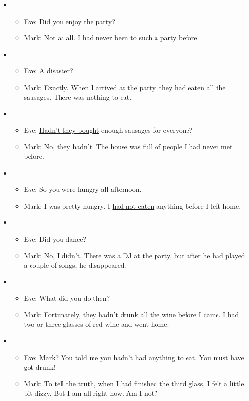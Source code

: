 \begin{itemize}

\item
\begin{itemize}
\item Eve: Did you enjoy the party?
\item Mark: Not at all. I \underline{had never been} to such a party before.
\end{itemize}

\item
\begin{itemize}
\item Eve: A disaster?
\item Mark: Exactly. When I arrived at the party, they \underline{had eaten} all the sausages. There 
was nothing to eat.
\end{itemize}

\item
\begin{itemize}
\item Eve: \underline{Hadn't they bought} enough sausages for everyone?
\item Mark: No, they hadn't. The house was full of people I \underline{had never met} before.
\end{itemize}

\item
\begin{itemize}
\item Eve: So you were hungry all afternoon.
\item Mark: I was pretty hungry. I \underline{had not eaten} anything before I left home.
\end{itemize}

\item
\begin{itemize}
\item Eve: Did you dance?
\item Mark: No, I didn't. There was a DJ at the party, but after he \underline{had played} a couple 
of songs, he disappeared.
\end{itemize}

\item
\begin{itemize}
\item Eve: What did you do then?
\item Mark: Fortunately, they \underline{hadn't drunk} all the wine before I came. I had two or three 
glasses of red wine and went home.
\end{itemize}

\item
\begin{itemize}
\item Eve: Mark? You told me you \underline{hadn't had} anything to eat. You must have got drunk!
\item Mark: To tell the truth, when I \underline{had finished} the third glass, I felt a little bit dizzy. But I am all right now. Am I not?
\end{itemize}

\end{itemize}

